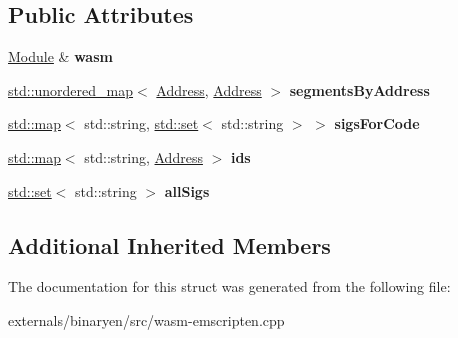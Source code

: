 \subsection*{Public Attributes}
\begin{DoxyCompactItemize}
\item 
\mbox{\label{structwasm_1_1emscripten_1_1_asm_const_walker_aecac8347978d753d4d1dbcfe242abec2}} 
\mbox{\hyperlink{classwasm_1_1_module}{Module}} \& {\bfseries wasm}
\item 
\mbox{\label{structwasm_1_1emscripten_1_1_asm_const_walker_a70580350310603481307116ab04431d1}} 
\mbox{\hyperlink{classstd_1_1unordered__map}{std\+::unordered\+\_\+map}}$<$ \mbox{\hyperlink{structwasm_1_1_address}{Address}}, \mbox{\hyperlink{structwasm_1_1_address}{Address}} $>$ {\bfseries segments\+By\+Address}
\item 
\mbox{\label{structwasm_1_1emscripten_1_1_asm_const_walker_a2f1dbf8c590c7571c65ec4b0f0a4c68e}} 
\mbox{\hyperlink{classstd_1_1map}{std\+::map}}$<$ std\+::string, \mbox{\hyperlink{classstd_1_1set}{std\+::set}}$<$ std\+::string $>$ $>$ {\bfseries sigs\+For\+Code}
\item 
\mbox{\label{structwasm_1_1emscripten_1_1_asm_const_walker_a67a29306132f3373ee74a360bdaf0772}} 
\mbox{\hyperlink{classstd_1_1map}{std\+::map}}$<$ std\+::string, \mbox{\hyperlink{structwasm_1_1_address}{Address}} $>$ {\bfseries ids}
\item 
\mbox{\label{structwasm_1_1emscripten_1_1_asm_const_walker_ace3edf25115ef01846928477f55f1ff2}} 
\mbox{\hyperlink{classstd_1_1set}{std\+::set}}$<$ std\+::string $>$ {\bfseries all\+Sigs}
\end{DoxyCompactItemize}
\subsection*{Additional Inherited Members}


The documentation for this struct was generated from the following file\+:\begin{DoxyCompactItemize}
\item 
externals/binaryen/src/wasm-\/emscripten.\+cpp\end{DoxyCompactItemize}

